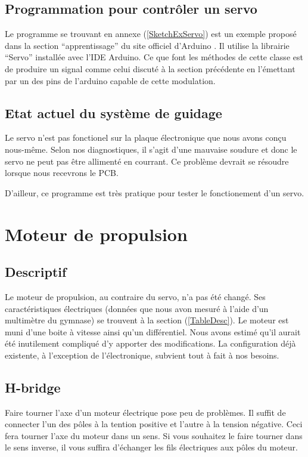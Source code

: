 \documentclass[a4paper,11pt]{report}
\begin{document}
{\subsection{Programmation pour contr\^oler un servo}
Le programme se trouvant en annexe (\ref{SketchExServo}) est un exemple propos\'e dans la section
``apprentissage'' du site officiel d'Arduino \cite{ServoSweep}. Il utilise la librairie
``Servo'' install\'ee avec l'IDE Arduino. Ce que font les m\'ethodes de cette
classe est de produire un signal comme celui discut\'e \`a la section
pr\'ec\'edente en l'émettant par un des pins de l'arduino capable de cette
modulation. 

\subsection{Etat actuel du système de guidage}
Le servo n'est pas fonctionel sur la plaque électronique que nous avons conçu
nous-même. Selon nos diagnostiques, il s'agit d'une mauvaise soudure et donc
le servo ne peut pas être allimenté en courrant. Ce problème devrait se
résoudre lorsque nous recevrons le PCB.


D'ailleur, ce programme est tr\`es pratique pour tester le fonctionement d'un servo. 

\section{Moteur de propulsion}

\subsection{Descriptif}

Le moteur de propulsion, au contraire du servo, n'a pas été changé.
 Ses caract\'eristiques \'electriques (donn\'ees que nous avon mesur\'e \`a l'aide
d'un multim\`etre du gymnase) se trouvent \`a la section
(\ref{TableDesc}). Le moteur est muni d'une boite \`a vitesse ainsi qu'un
diff\'erentiel. Nous avons estim\'e qu'il aurait \'et\'e
inutilement compliqu\'e d'y apporter des modifications. La
configuration d\'ej\`a existente, \`a l'exception de l'\'electronique,
subvient tout \`a fait \`a nos besoins.  

\subsection{H-bridge}
Faire tourner l'axe d'un moteur \'electrique pose peu de probl\`emes. Il
suffit de connecter l'un des p\^oles \`a la tention positive et l'autre \`a la tension
n\'egative. Ceci fera tourner l'axe du moteur dans un sens. Si vous souhaitez le
faire tourner dans le sens inverse, il vous suffira d'\'echanger les fils
\'electriques aux p\^oles du moteur.

}
\end{document}
